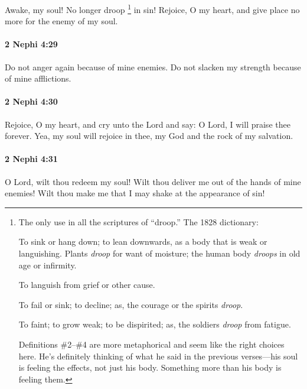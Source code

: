 			Awake, my soul!
			No longer droop%
				\footnote{%
					\label{2NEPHI-4-28-droop}%
					The only use in all the scriptures of ``droop.'' The 1828 dictionary:
						\begin{compactitem}
							\item[1] To sink or hang down; to lean downwards, as a body that is weak or languishing. Plants \textit{droop} for want of moisture; the human body \textit{droops} in old age or infirmity.
							\item[2] To languish from grief or other cause.
							\item[3] To fail or sink; to decline; as, the courage or the spirits \textit{droop}.
							\item[4] To faint; to grow weak; to be dispirited; as, the soldiers \textit{droop} from fatigue.
						\end{compactitem}
					Definitions \#2--\#4 are more metaphorical and seem like the right choices here. He's definitely thinking of what he said in the previous verses---his soul is feeling the effects, not just his body. Something more than his body is feeling them.
					}
			in sin!
			Rejoice, O my heart,
			and give place no more for the enemy of my soul.

		\paragraph{2 Nephi 4:29} %
			\label{2NEPHI-4-29}

			Do not anger again because of mine enemies.
			Do not slacken my strength because of mine afflictions.

		\paragraph{2 Nephi 4:30} %
			\label{2NEPHI-4-30}

			Rejoice, O my heart,
			and cry unto the Lord and say:
			O Lord, I will praise thee forever.
			Yea, my soul will rejoice in thee, my God and the rock of my salvation.

		\paragraph{2 Nephi 4:31} %
			\label{2NEPHI-4-31}

			O Lord, wilt thou redeem my soul!
			Wilt thou deliver me out of the hands of mine enemies!
			Wilt thou make me that I may shake at the appearance of sin!


